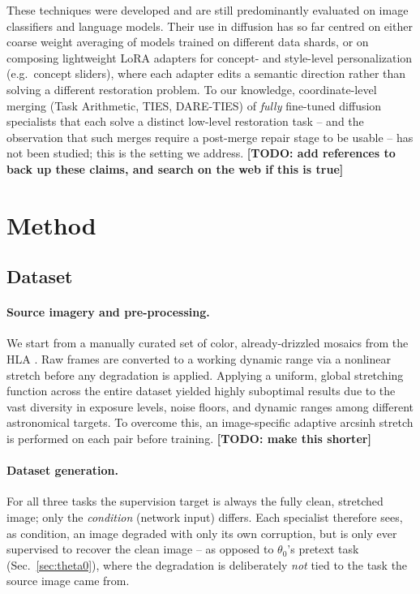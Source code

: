 \documentclass{article}
\newcommand{\todo}[1]{\textbf{\color{red}[TODO: #1]}}
\begin{document}
These techniques were developed and are still predominantly evaluated on image classifiers and language models. Their use in diffusion has so far centred on either coarse weight averaging of models trained on different data shards, or on composing lightweight LoRA adapters for concept- and style-level personalization (e.g.\ concept sliders), where each adapter edits a semantic direction rather than solving a different restoration problem. To our knowledge, coordinate-level merging (Task Arithmetic, TIES, DARE-TIES) of \emph{fully} fine-tuned diffusion specialists that each solve a distinct low-level restoration task -- and the observation that such merges require a post-merge repair stage to be usable -- has not been studied; this is the setting we address. \todo{add references to back up these claims, and search on the web if this is true}

\section{Method}
\label{sec:method}

\subsection{Dataset}
\label{sec:data}

\paragraph*{Source imagery and pre-processing.} We start from a manually curated set of color, already-drizzled mosaics from the HLA \cite{hla}. Raw frames are converted to a working dynamic range via a nonlinear stretch before any degradation is applied. Applying a uniform, global stretching function across the entire dataset yielded highly suboptimal results due to the vast diversity in exposure levels, noise floors, and dynamic ranges among different astronomical targets. To overcome this, an image-specific adaptive arcsinh stretch is performed on each pair before training. \todo{make this shorter}

\paragraph*{Dataset generation.} For all three tasks the supervision target is always the fully clean, stretched image; only the \emph{condition} (network input) differs. Each specialist therefore sees, as condition, an image degraded with only its own corruption, but is only ever supervised to recover the clean image -- as opposed to $\theta_0$'s pretext task (Sec.~\ref{sec:theta0}), where the degradation is deliberately \emph{not} tied to the task the source image came from.
\end{document}
